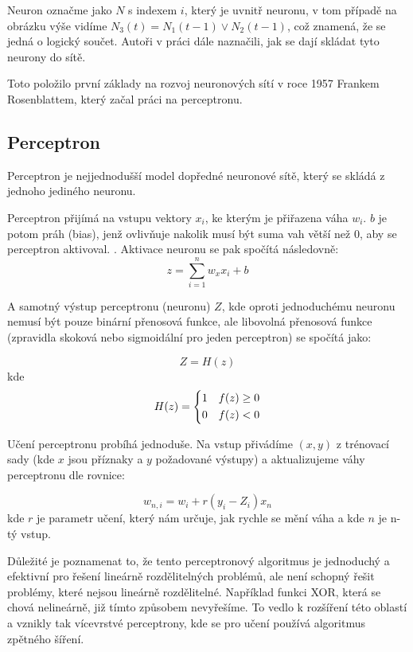 \documentclass[FM,BP,fonts]{tulthesis}
\begin{document}
Neuron označme jako $N$ s indexem $i$, který je uvnitř neuronu, v tom případě na obrázku výše vidíme $N_3(t) = N_1(t-1) \vee N_2(t-1)$, což znamená, že se jedná o logický součet. \cite{mcculloch1943logical} Autoři v práci dále naznačili, jak se dají skládat tyto neurony do sítě. 

Toto položilo první základy na rozvoj neuronových sítí v roce 1957 Frankem Rosenblattem, který začal práci na perceptronu.
\newpage
\subsection{Perceptron}
Perceptron je nejjednodušší model dopředné neuronové sítě, který se skládá z jednoho jediného neuronu.

Perceptron přijímá na vstupu vektory $x_i$, ke kterým je přiřazena váha $w_i$. $b$ je potom práh (bias), jenž ovlivňuje nakolik musí být suma vah větší než 0, aby se perceptron aktivoval. \cite{martinpilatNN}. Aktivace neuronu se pak spočítá následovně:
\label{eq:activation_percep}
\begin{equation}
	z = \sum_{i=1}^{n} w_xx_i + b
\end{equation}

A samotný výstup perceptronu (neuronu) $Z$, kde oproti jednoduchému neuronu nemusí být pouze binární přenosová funkce, ale libovolná přenosová funkce (zpravidla skoková nebo sigmoidální pro jeden perceptron) \cite{martinpilatNN} se spočítá jako:

\begin{equation}
	Z = H(z)
\end{equation}
kde
\begin{equation}
	H(z) = \begin{dcases}
		1 & f(z) \geq 0 \\
		0 & f(z) < 0
	\end{dcases}
\end{equation}

Učení perceptronu probíhá jednoduše. Na vstup přivádíme $(x,y)$ z trénovací sady (kde $x$ jsou příznaky a $y$ požadované výstupy) a aktualizujeme váhy perceptronu dle rovnice:

\begin{equation}\label{eq:learning_percep}
	w_{n,i} = w_i + r(y_i-Z_i)x_n
\end{equation}
kde $r$ je parametr učení, který nám určuje, jak rychle se mění váha a kde $n$ je n-tý vstup.  

Důležité je poznamenat to, že tento perceptronový algoritmus je jednoduchý a efektivní pro řešení lineárně rozdělitelných problémů, ale není schopný řešit problémy, které nejsou lineárně rozdělitelné. Například funkci XOR, která se chová nelineárně, již tímto způsobem nevyřešíme. To vedlo k rozšíření této oblastí a vznikly tak vícevrstvé perceptrony, kde se pro učení používá algoritmus zpětného šíření.
\end{document}
